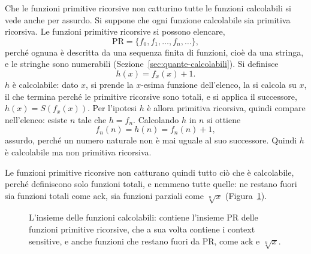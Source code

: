 \documentclass[a4paper, 11pt, oneside]{book}
\theoremstyle{formale}
\begin{document}
    Che le funzioni primitive ricorsive non catturino tutte le funzioni calcolabili si
    vede anche per assurdo. Si suppone che ogni funzione calcolabile sia primitiva
    ricorsiva. Le funzioni primitive ricorsive si possono elencare,
    \begin{equation*}
        \mathrm{PR} = \{f_0, f_1, \dots, f_n, \dots\},
    \end{equation*}
    perch\'e ognuna \`e descritta da una sequenza finita di funzioni, cio\`e da una
    stringa, e le stringhe sono numerabili (Sezione~\ref{sec:quante-calcolabili}). Si
    definisce
    \begin{equation*}
        h(x) = f_x(x) + 1.
    \end{equation*}
    $h$ \`e calcolabile: dato $x$, si prende la $x$-esima funzione dell'elenco, la si
    calcola su $x$, il che termina perch\'e le primitive ricorsive sono totali, e si
    applica il successore, $h(x) = S(f_x(x))$. Per l'ipotesi $h$ \`e allora primitiva
    ricorsiva, quindi compare nell'elenco: esiste $n$ tale che $h = f_n$. Calcolando
    $h$ in $n$ si ottiene
    \begin{equation*}
        f_n(n) = h(n) = f_n(n) + 1,
    \end{equation*}
    assurdo, perch\'e un numero naturale non \`e mai uguale al suo successore. Quindi
    $h$ \`e calcolabile ma non primitiva ricorsiva.

    Le funzioni primitive ricorsive non catturano quindi tutto ci\`o che \`e
    calcolabile, perch\'e definiscono solo funzioni totali, e nemmeno tutte quelle: ne
    restano fuori sia funzioni totali come $\mathrm{ack}$, sia funzioni parziali come
    $\sqrt[n]{x}$ (Figura~\ref{fig:pr-parziali}).

    \begin{figure}[H]
        \centering
        \caption{L'insieme delle funzioni calcolabili: contiene l'insieme $\mathrm{PR}$
            delle funzioni primitive ricorsive, che a sua volta contiene i context
            sensitive, e anche funzioni che restano fuori da $\mathrm{PR}$, come
            $\mathrm{ack}$ e $\sqrt[n]{x}$.}
        \label{fig:pr-parziali}
    \end{figure}
\end{document}
